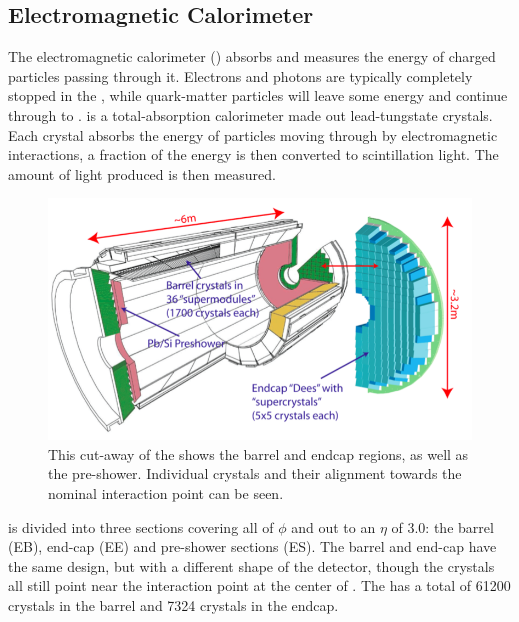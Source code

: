 \subsection{Electromagnetic Calorimeter}

The electromagnetic calorimeter (\ECAL) absorbs and measures the energy of charged particles passing through it. Electrons and photons are typically completely stopped in the \ECAL, while quark-matter particles will leave some energy and continue through to \HCAL. \ECAL is a total-absorption calorimeter made out lead-tungstate crystals. Each crystal absorbs the energy of particles moving through by electromagnetic interactions, a fraction of the energy is then converted to scintillation light. The amount of light produced is then measured.

\begin{figure}[!tp]
    \centering
    \includegraphics[width=\textwidth]{figures/ECAL_diag.png}
    \caption[
       \CMS \ECAL diagram.
    ]{
        This cut-away of the \ECAL shows the barrel and endcap regions, as well as the pre-shower. Individual crystals and their alignment towards the nominal interaction point can be seen. \cite{ecalPerf}
    }
    \label{fig:ecal}
\end{figure}

\ECAL is divided into three sections covering all of \ensuremath{\phi} and out to an \ensuremath{\eta} of 3.0: the barrel (EB), end-cap (EE) and pre-shower sections (ES).  The barrel and end-cap have the same design, but with a different shape of the detector, though the crystals all still point near the interaction point at the center of \CMS. The \ECAL has a total of 61200 crystals in the barrel and 7324 crystals in the endcap. 

